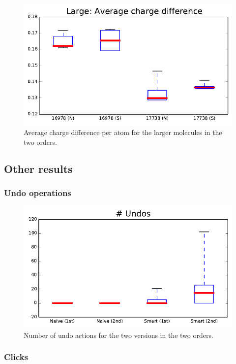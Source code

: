 \begin{figure}
\center
\includegraphics[width=.9\textwidth]{img/graphs/1c_01.pdf}
\caption{Average charge difference per atom for the larger molecules in the two orders.}
\end{figure}

\subsection{Other results}
\nlipsum

\subsubsection{Undo operations}
\nlipsum

\begin{figure}
\center
\includegraphics[width=.9\textwidth]{img/graphs/1a_10.pdf}
\caption{Number of undo actions for the two versions in the two orders.}
\end{figure}

\subsubsection{Clicks}
\nlipsum

